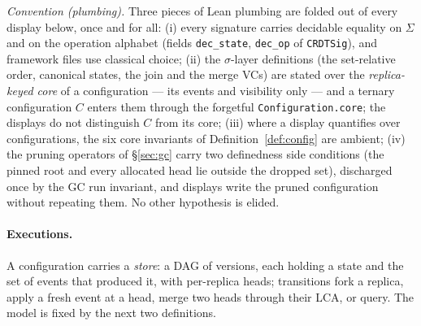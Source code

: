 \documentclass[11pt]{article}
\newcommand{\lean}[1]{\texttt{#1}}
\begin{document}
\emph{Convention (plumbing).} Three pieces of Lean plumbing are folded
out of every display below, once and for all: (i) every signature
carries decidable equality on $\Sigma$ and on the operation alphabet
(fields \lean{dec\_state}, \lean{dec\_op} of \lean{CRDTSig}), and
framework files use classical choice; (ii) the $\sigma$-layer
definitions (the set-relative order, canonical states, the join and the
merge VCs) are stated over the \emph{replica-keyed core} of a
configuration --- its events and visibility only --- and a ternary
configuration $C$ enters them through the forgetful
\lean{Configuration.core}; the displays do not distinguish $C$ from its
core; (iii) where a display quantifies over configurations, the six core
invariants of Definition~\ref{def:config} are ambient; (iv) the pruning
operators of \S\ref{sec:gc} carry two definedness side conditions (the
pinned root and every allocated head lie outside the dropped set),
discharged once by the GC run invariant, and displays write the pruned
configuration without repeating them. No other
hypothesis is elided.

\paragraph{Executions.} A configuration carries a \emph{store}: a DAG of
versions, each holding a state and the set of events that produced it,
with per-replica heads; transitions fork a replica, apply a fresh event
at a head, merge two heads through their LCA, or query. The model is
fixed by the next two definitions.
\end{document}
